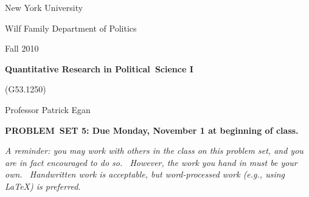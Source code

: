 \documentclass[11pt]{article}
\begin{document}
New York University

Wilf Family Department of Politics

Fall 2010

\begin{center}
{\large \textbf{Quantitative Research in Political\ Science I}}

(G53.1250)

Professor Patrick Egan

\bigskip

\textbf{PROBLEM\ SET 5: Due Monday, November 1 at beginning of class.}
\end{center}

\textit{A reminder: you may work with others in the class on this problem
set, and you are in fact encouraged to do so. \ However, the work you hand
in must be your own. \ Handwritten work is acceptable, but word-processed
work (e.g., using LaTeX) is preferred.}

\bigskip
\end{document}
